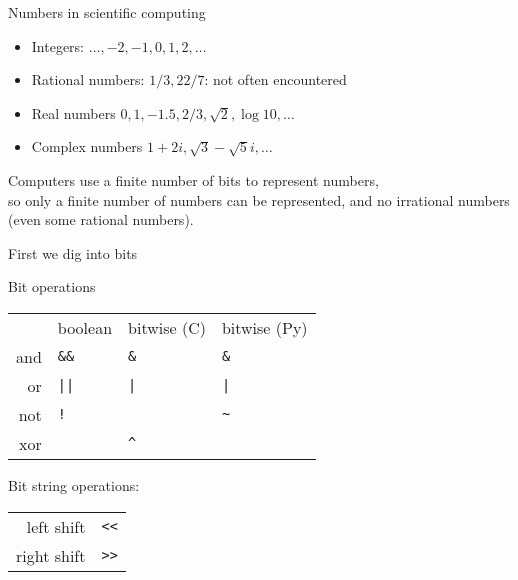 
\newcommand\repr{\mathop{\mathrm{rep}}}
\newcommand\intr{\mathop{\mathrm{int}}}

\begin{numberedframe}{Numbers in scientific computing}
\begin{itemize}
\item Integers: $\ldots,-2,-1,0,1,2,\ldots$
\item Rational numbers: $1/3,22/7$: not often encountered
\item Real numbers $0,1,-1.5,2/3,\sqrt 2,\log 10,\ldots$
\item  Complex numbers $1+2i,\sqrt 3-\sqrt 5i,\ldots$
\end{itemize}

Computers use a finite number of bits to represent numbers,\\
so only a finite number of numbers can be represented, and 
no irrational numbers (even some rational numbers).
\end{numberedframe}

 {First we dig into bits}

\begin{numberedframe}{Bit operations}
\begin{tabular}{|r|lll|}
  \toprule
  &boolean&bitwise (C)&bitwise (Py)\\
  and&\verb+&&+ & \verb+&+ & \verb+&+ \\
  or &\verb+||+ & \verb+|+ & \verb+|+ \\
  not&\verb+!+  &          & \verb+~+ \\
  xor&          & \verb+^+ &          \\
  \bottomrule
\end{tabular}

Bit string operations:

\begin{tabular}{|r|l|}
  \toprule
  left  shift& \verb+<<+ \\
  right shift& \verb+>>+ \\
  \bottomrule
\end{tabular}
\end{numberedframe}

